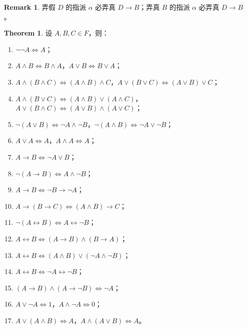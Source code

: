 \documentclass[oneside]{book}
\theoremstyle{definition}
\newtheorem{theorem}{Theorem}[section]
\newtheorem{remark}{Remark}[section]
\begin{document}
\begin{remark}弄假 \( D \) 的指派 \( \alpha \) 必弄真 \( D \to B \)；弄真 \( B \) 的指派 \( \alpha \) 必弄真 \( D \to B \)。
\end{remark}
\begin{theorem}
	设 \( A,B,C \in F \)，则：
	\begin{enumerate}
		\item \( \neg\neg A \Leftrightarrow A \)；
		\item \( A \land B \Leftrightarrow B \land A \)，\( A \lor B \Leftrightarrow B \lor A \)；
		\item \( A \land (B \land C) \Leftrightarrow (A \land B) \land C \)，\( A \lor (B \lor C) \Leftrightarrow (A \lor B) \lor C \)；
		\item \( A \land (B \lor C) \Leftrightarrow (A \land B) \lor (A \land C) \)，\( A \lor (B \land C) \Leftrightarrow (A \lor B) \land (A \lor C) \)；
		\item \( \neg(A \lor B) \Leftrightarrow \neg A \land \neg B \)，\( \neg(A \land B) \Leftrightarrow \neg A \lor \neg B \)；
		\item \( A \lor A \Leftrightarrow A \)，\( A \land A \Leftrightarrow A \)；
		\item \( A \to B \Leftrightarrow \neg A \lor B \)；
		\item \( \neg(A \to B) \Leftrightarrow A \land \neg B \)；
		\item \( A \to B \Leftrightarrow \neg B \to \neg A \)；
		\item \( A \to (B \to C) \Leftrightarrow (A \land B) \to C \)；
		\item \( \neg(A \leftrightarrow B) \Leftrightarrow A \leftrightarrow \neg B \)；
		\item \( A \leftrightarrow B \Leftrightarrow (A \to B) \land (B \to A) \)；
		\item \( A \leftrightarrow B \Leftrightarrow (A \land B) \lor (\neg A \land \neg B) \)；
		\item \( A \leftrightarrow B \Leftrightarrow \neg A \leftrightarrow \neg B \)；
		\item \( (A \to B) \land (A \to \neg B) \Leftrightarrow \neg A \)；
		\item \( A \lor \neg A \Leftrightarrow 1 \)，\( A \land \neg A \Leftrightarrow 0 \)；
		\item \( A \lor (A \land B) \Leftrightarrow A \)，\( A \land (A \lor B) \Leftrightarrow A \)。
	\end{enumerate}
\end{theorem}
\end{document}
